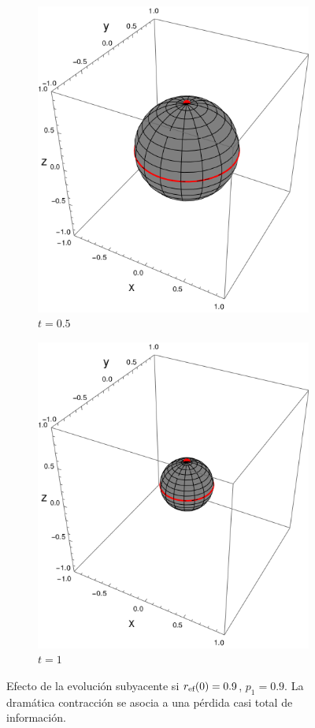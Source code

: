\begin{figure}[ht!]
\begin{subfigure}{0.32\textwidth}
    \includegraphics[width=0.9\linewidth]{chapter3/figures_toy/sphere_swapcontraction_t=0.5_z=0.9_p=0.9.png}
    \caption{$t=0.5$}
  \end{subfigure}
  \begin{subfigure}{0.32\textwidth}
    \centering
    \includegraphics[width=0.9\linewidth]{chapter3/figures_toy/sphere_swapcontraction_t=1.0_z=0.9_p=0.9.png}
    \caption{$t=1$}
  \end{subfigure}
  \caption{Efecto de la evolución subyacente si $r_{\text{ef}}(0)=0.9$, $p_{1}=0.9$. La dramática contracción se asocia a una pérdida casi total de información.}
  \label{fig:SWAPFactorSequence}
  \end{figure}

